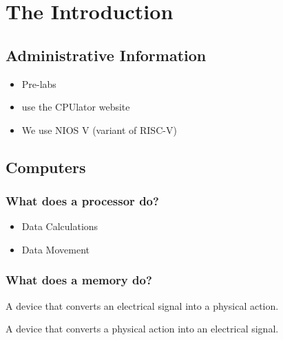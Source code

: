 \chapter{The Introduction}
\section{Administrative Information}
\begin{itemize}
    \item Pre-labs
    \item use the CPUlator website
    \item We use NIOS V (variant of RISC-V)
\end{itemize}

\section{Computers}
\subsection*{What does a processor do?}
\begin{itemize}
    \item Data Calculations

    \item Data Movement
\end{itemize}

\subsection*{What does a memory do?}
\begin{figure}[h]
    \centering
\end{figure}

\begin{definition}
    [Actuator]
    A device that converts an electrical signal into a physical action.
\end{definition}

\begin{definition}
    [Sensor]
    A device that converts a physical action into an electrical signal.
\end{definition}

